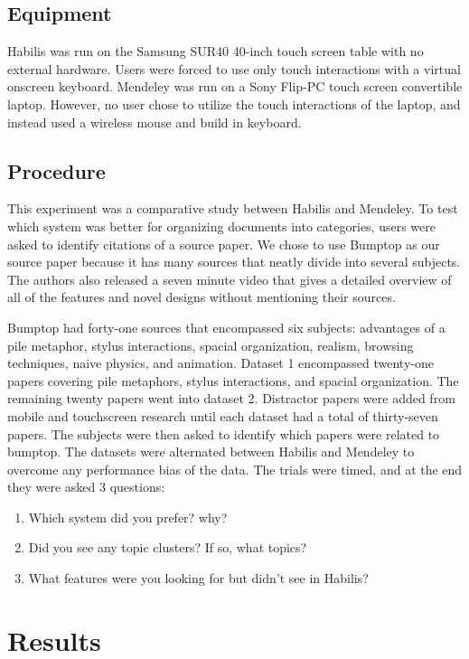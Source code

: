 \documentclass{article}
\begin{document}
\subsection*{Equipment}
	Habilis was run on the Samsung SUR40 40-inch touch screen table with no external hardware.  Users were forced to use only touch interactions with a virtual onscreen keyboard. Mendeley was run on a Sony Flip-PC touch screen convertible laptop.  However, no user chose to utilize the touch interactions of the laptop, and instead used a wireless mouse and build in keyboard.  
	
\subsection*{Procedure}

	This experiment was a comparative study between Habilis and Mendeley.  To test which system was better for organizing documents into categories, users were asked to identify citations of a source paper.  We chose to use Bumptop \cite{Agarawala2006}
	as our source paper because it has many sources that neatly divide into several subjects.  The authors also released a seven minute video that gives a detailed overview of all of the features and novel designs without mentioning their sources.   
	
	Bumptop had forty-one sources that encompassed six subjects: advantages of a pile metaphor, stylus interactions, spacial organization, realism, browsing techniques, naive physics, and animation.  Dataset 1 encompassed twenty-one papers covering pile metaphors, stylus interactions, and spacial organization.  The remaining twenty papers went into dataset 2.  Distractor papers were added from mobile and touchscreen research until each dataset had a total of thirty-seven papers.  The subjects were then asked to identify which papers were related to bumptop.  The datasets were alternated between Habilis and Mendeley to overcome any performance bias of the data.  The trials were timed, and at the end they were asked 3 questions:
	\begin{enumerate}
	\item Which system did you prefer? why?
	\item Did you see any topic clusters?  If so, what topics?
	\item What features were you looking for but didn't see in Habilis?
	\end{enumerate}
\section{Results}
\end{document}
